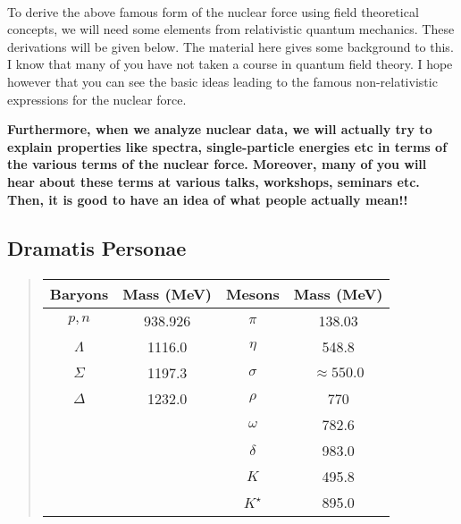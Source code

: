 \documentclass[%
twoside,                 %
final,                   %
10pt]{article}
\begin{document}
\paragraph{}
To derive the above famous form of the nuclear force using field theoretical concepts, we will need some 
elements from relativistic quantum mechanics. These derivations will be given below. 
The material here gives some background to this.
I know that many of you have not taken a course in quantum field theory. I hope however that you can see the basic ideas leading to the famous non-relativistic expressions for the nuclear force. 

\textbf{Furthermore, when we analyze nuclear data, we will actually try to explain properties like spectra, single-particle energies etc in terms of the various terms of the nuclear force. Moreover, many of you will hear about these terms at various talks, workshops, seminars etc. Then, it is good to have an idea of what people actually mean!!}

  

\subsection*{Dramatis Personae}

\paragraph{}


\begin{quote}
\begin{tabular}{cccc}
\hline
\multicolumn{1}{c}{ Baryons } & \multicolumn{1}{c}{ Mass (MeV) } & \multicolumn{1}{c}{ Mesons } & \multicolumn{1}{c}{ Mass (MeV) } \\
\hline
$p,n$     & 938.926    & $\pi$       & 138.03          \\
$\Lambda$ & 1116.0     & $\eta$      & 548.8           \\
$\Sigma$  & 1197.3     & $\sigma$    & $\approx 550.0$ \\
$\Delta$  & 1232.0     & $\rho$      & 770             \\
          &            & $\omega$    & 782.6           \\
          &            & $\delta$    & 983.0           \\
          &            & $K$         & 495.8           \\
          &            & $K^{\star}$ & 895.0           \\
\hline
\end{tabular}
\end{quote}
\end{document}
